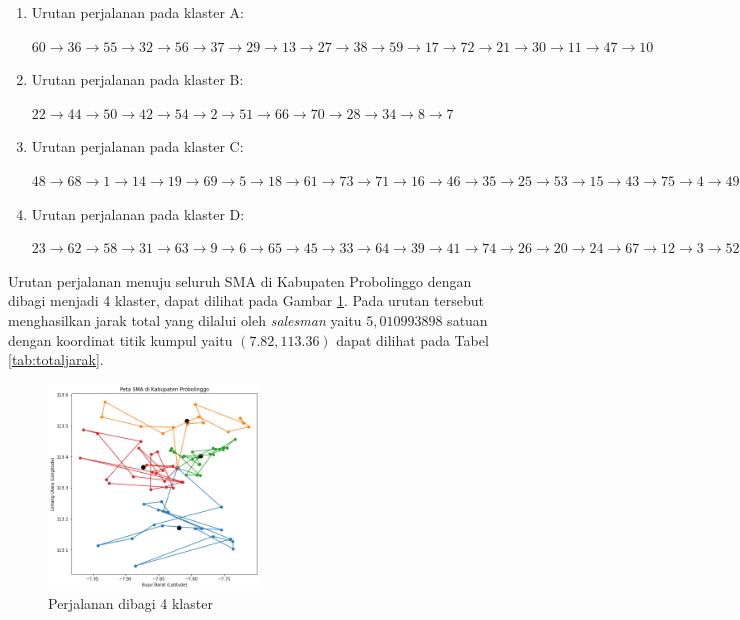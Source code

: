 \begin{enumerate}

\item Urutan perjalanan pada klaster A:

$60\rightarrow36\rightarrow55\rightarrow32\rightarrow56\rightarrow37\rightarrow29\rightarrow13\rightarrow27\rightarrow38\rightarrow59\rightarrow17\rightarrow72\rightarrow21\rightarrow30\rightarrow11\rightarrow47\rightarrow10$

\item Urutan perjalanan pada klaster B:

$22\rightarrow44\rightarrow50\rightarrow42\rightarrow54\rightarrow2\rightarrow51\rightarrow66\rightarrow70\rightarrow28\rightarrow34\rightarrow8\rightarrow7$

\item Urutan perjalanan pada klaster C:

$48\rightarrow68\rightarrow1\rightarrow14\rightarrow19\rightarrow69\rightarrow5\rightarrow18\rightarrow61\rightarrow73\rightarrow71\rightarrow16\rightarrow46\rightarrow35\rightarrow25\rightarrow53\rightarrow15\rightarrow43\rightarrow75\rightarrow4\rightarrow49\rightarrow40\rightarrow57$

\item Urutan perjalanan pada klaster D:

$23\rightarrow62\rightarrow58\rightarrow31\rightarrow63\rightarrow9\rightarrow6\rightarrow65\rightarrow45\rightarrow33\rightarrow64\rightarrow39\rightarrow41\rightarrow74\rightarrow26\rightarrow20\rightarrow24\rightarrow67\rightarrow12\rightarrow3\rightarrow52$

\end{enumerate}

Urutan perjalanan menuju seluruh SMA di Kabupaten Probolinggo dengan dibagi menjadi 4 klaster, dapat dilihat pada Gambar \ref{fig:hasil_mtsp4}. Pada urutan tersebut menghasilkan jarak total yang dilalui oleh \textit{salesman} yaitu $5,010993898$ satuan dengan koordinat titik kumpul yaitu $(7.82, 113.36)$ dapat dilihat pada Tabel \ref{tab:totaljarak}.


\begin{figure}[H]
\centering
\includegraphics[width=0.5\textwidth]{Gambar/hasil_mtsp/4}
\caption{Perjalanan dibagi 4 klaster}
\label{fig:hasil_mtsp4}
\end{figure}

